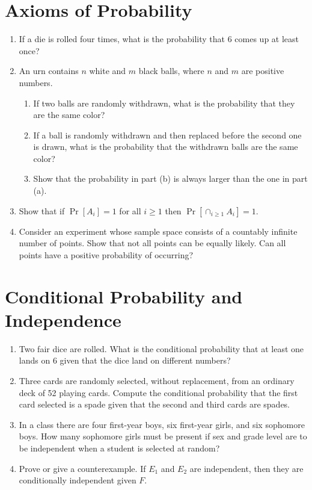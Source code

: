 \documentclass[11pt,letterpaper]{article}
\begin{document}
\section{Axioms of Probability}
\begin{enumerate}

	\item If a die is rolled four times, what is the probability that 6 comes up at least once?



	\item An urn contains $n$ white and $m$ black balls, where $n$ and $m$ are positive numbers.
	\begin{enumerate}
	 	\item If two balls are randomly withdrawn, what is the probability that they are the same color?
	 	\item If a ball is randomly withdrawn and then replaced before the second one is drawn, what is the probability that the withdrawn balls are the same color?
	 	\item Show that the probability in part (b) is always larger than the one in part (a).
	\end{enumerate} 

	\item Show that if $\Pr[A_i] = 1$ for all $i\geq 1$ then $\Pr[\cap_{i\geq 1}A_i] = 1$.

	\item Consider an experiment whose sample space consists of a countably infinite number of points. Show that not all points can be equally likely. Can all points have a positive probability of occurring?

\end{enumerate}

\section{Conditional Probability and Independence}
\begin{enumerate}

	\item Two fair dice are rolled. What is the conditional probability that at least one lands on 6 given that the dice land on different numbers?

	\item Three cards are randomly selected, without replacement, from an ordinary deck of 52 playing cards. Compute the conditional probability that the first card selected is a spade given that the second and third cards are spades.

	\item In a class there are four first-year boys, six first-year girls, and six sophomore boys. How many sophomore girls must be present if sex and grade level are to be independent when a student is selected at random?

	\item Prove or give a counterexample. If $E_1$ and $E_2$ are independent, then they are conditionally independent given $F$.
\end{enumerate}
\end{document}
